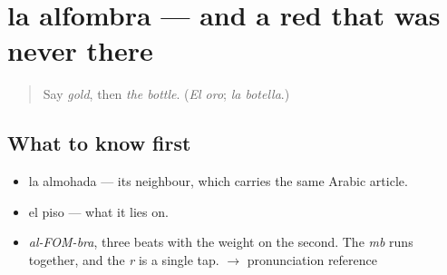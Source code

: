 \section[la alfombra]{la alfombra — and a red that was never there}

\label{lesson:ES-C373-alfombra}



\begin{quote}
Say \emph{gold}, then \emph{the bottle}. (\emph{El oro}; \emph{la botella}.)
\end{quote}

\subsection*{What to know first}
\begin{itemize}
\raggedright
  \item la almohada — its neighbour, which carries the same Arabic article.
  \item el piso — what it lies on.
\end{itemize}

\begin{sounds}
\begin{itemize}
\raggedright
  \item \emph{al-FOM-bra}, three beats with the weight on the second. The \emph{mb} runs together, and the \emph{r} is a single tap. $\to$ pronunciation reference
\end{itemize}
\end{sounds}

